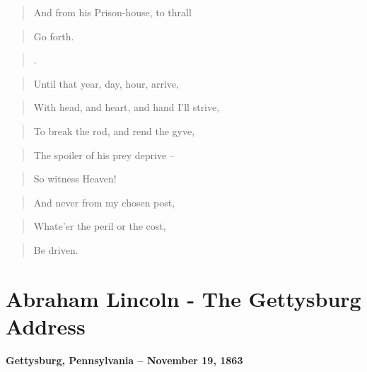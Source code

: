 \documentclass[a4paper]{amsbook}
\begin{document}
\begin{quote}And from his Prison-house, to thrall\end{quote}

\begin{quote}Go forth.\end{quote}

\begin{quote}.\end{quote}

\begin{quote}Until that year, day, hour, arrive,\end{quote}

\begin{quote}With head, and heart, and hand I'll strive,\end{quote}

\begin{quote}To break the rod, and rend the gyve,\end{quote}

\begin{quote}The spoiler of his prey deprive –\end{quote}

\begin{quote}So witness Heaven!\end{quote}

\begin{quote}And never from my chosen post,\end{quote}

\begin{quote}Whate'er the peril or the cost,\end{quote}

\begin{quote}Be driven.\end{quote}


\chapter{Abraham Lincoln - The Gettysburg Address}

\textbf{\Large{Gettysburg, Pennsylvania -- November 19, 1863 }}

\vspace{10 mm}
\end{document}
